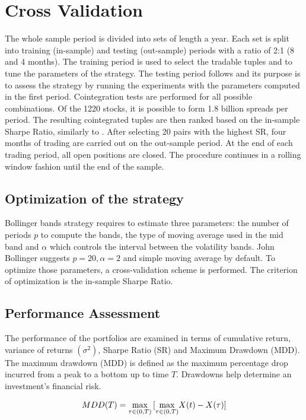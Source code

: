 \documentclass[11pt,a4,twosided,singlespacing,titlepagenumber=on]{scrreprt}
\numberwithin{equation}{chapter} %
\theoremstyle{remark}
\begin{document}
\section{Cross Validation}
The whole sample period is divided into sets of length a year. Each set is split into training (in-sample) and testing (out-sample) periods with a ratio of 2:1 (8 and 4 months). The training period is used to select the tradable tuples and to tune the parameters of the strategy. The testing period follows and its purpose is to assess the strategy by running the experiments with the parameters computed in the first period. Cointegration tests are performed for all possible combinations. Of the 1220 stocks, it is possible to form 1.8 billion spreads per period. The resulting cointegrated tuples are then ranked based on the in-sample Sharpe Ratio, similarly to \cite{gatev2006}. After selecting 20 pairs with the highest SR, four months of trading are carried out on the out-sample period. At the end of each trading period, all open positions are closed. The procedure continues in a rolling window fashion until the end of the sample.

\subsection{Optimization of the strategy}

Bollinger bands strategy requires to estimate three parameters: the number of periods $p$ to compute the bands, the type of moving average used in the mid band and $\alpha$ which controls the interval between the volatility bands. John Bollinger suggests $p = 20, \alpha = 2$ and simple moving average by default. To optimize those parameters, a cross-validation scheme is performed. The criterion of optimization is the in-sample Sharpe Ratio.

\subsection{Performance Assessment}
The performance of the portfolios are examined in terms of cumulative return, variance of returns $(\sigma^2)$, Sharpe Ratio (SR) and Maximum Drawdown (MDD). The maximum drawdown (MDD) is defined as the maximum percentage drop incurred from a peak to a bottom up to time $T$. Drawdowns help determine an investment's financial risk.

$$MDD(T) = \smash{\displaystyle\max_{\tau \in (0,T)}} \left[\smash{\displaystyle\max_{\tau \in (0,T)}} X(t) - X(\tau) \right] $$
\end{document}
